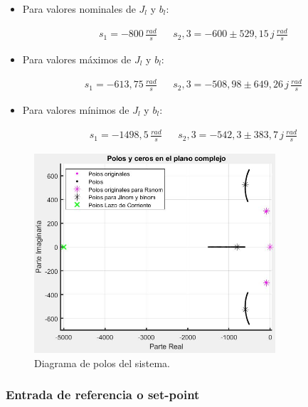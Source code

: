\documentclass{article}
\begin{document}
\begin{itemize}
    \item Para valores nominales de $J_l$ y $b_l$:
    
    \begin{align*}
        s_1 = -800\, \frac{rad}{s} & & s_2,3  = -600 \pm 529,15\, j \, \frac{rad}{s} 
    \end{align*}
    
    \item Para valores máximos de $J_l$ y $b_l$:
    
    \begin{align*}
        s_1 = -613,75\, \frac{rad}{s} & & s_2,3  = -508,98 \pm 649,26\, j \, \frac{rad}{s} 
    \end{align*}

    \item Para valores mínimos de $J_l$ y $b_l$:
    
    \begin{align*}
        s_1 = -1498,5\, \frac{rad}{s} & & s_2,3  = -542,3 \pm 383,7\, j \, \frac{rad}{s} 
    \end{align*}

\end{itemize}

\begin{figure}[H]
    \centering
    \includegraphics[width=0.8\textwidth]{polos.jpg}
    \caption{Diagrama de polos del sistema.}
\end{figure}


\subsubsection{Entrada de referencia o set-point}
\end{document}
